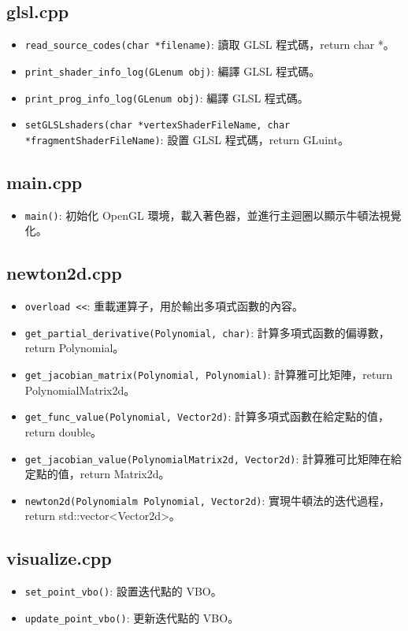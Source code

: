 \documentclass[a4paper,12pt]{article}
\begin{document}
\subsection{glsl.cpp}
\begin{itemize}
    \item \texttt{read\_source\_codes(char *filename)}: 讀取 GLSL 程式碼，return char *。
    \item \texttt{print\_shader\_info\_log(GLenum obj)}: 編譯 GLSL 程式碼。
    \item \texttt{print\_prog\_info\_log(GLenum obj)}: 編譯 GLSL 程式碼。
    \item \texttt{setGLSLshaders(char *vertexShaderFileName, char *fragmentShaderFileName)}: 設置 GLSL 程式碼，return GLuint。
\end{itemize}
\subsection{main.cpp}
\begin{itemize}
    \item \texttt{main()}: 初始化 OpenGL 環境，載入著色器，並進行主迴圈以顯示牛頓法視覺化。
\end{itemize}

\subsection{newton2d.cpp}
\begin{itemize}
    \item \texttt{overload <<}: 重載運算子，用於輸出多項式函數的內容。
    \item \texttt{get\_partial\_derivative(Polynomial, char)}: 計算多項式函數的偏導數，return Polynomial。
    \item \texttt{get\_jacobian\_matrix(Polynomial, Polynomial)}: 計算雅可比矩陣，return PolynomialMatrix2d。
    \item \texttt{get\_func\_value(Polynomial, Vector2d)}: 計算多項式函數在給定點的值，return double。
    \item \texttt{get\_jacobian\_value(PolynomialMatrix2d, Vector2d)}: 計算雅可比矩陣在給定點的值，return Matrix2d。
    \item \texttt{newton2d(Polynomialm Polynomial, Vector2d)}: 實現牛頓法的迭代過程，return std::vector<Vector2d>。
\end{itemize}

\subsection{visualize.cpp}
\begin{itemize}
    \item \texttt{set\_point\_vbo()}: 設置迭代點的 VBO。
    \item \texttt{update\_point\_vbo()}: 更新迭代點的 VBO。
\end{itemize}
\end{document}
